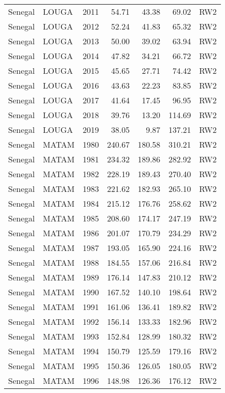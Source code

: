 \begin{longtable}{lllrrrl}
  Senegal & LOUGA & 2011 & 54.71 & 43.38 & 69.02 & RW2 \\ 
  Senegal & LOUGA & 2012 & 52.24 & 41.83 & 65.32 & RW2 \\ 
  Senegal & LOUGA & 2013 & 50.00 & 39.02 & 63.94 & RW2 \\ 
  Senegal & LOUGA & 2014 & 47.82 & 34.21 & 66.72 & RW2 \\ 
  Senegal & LOUGA & 2015 & 45.65 & 27.71 & 74.42 & RW2 \\ 
  Senegal & LOUGA & 2016 & 43.63 & 22.23 & 83.85 & RW2 \\ 
  Senegal & LOUGA & 2017 & 41.64 & 17.45 & 96.95 & RW2 \\ 
  Senegal & LOUGA & 2018 & 39.76 & 13.20 & 114.69 & RW2 \\ 
  Senegal & LOUGA & 2019 & 38.05 & 9.87 & 137.21 & RW2 \\ 
  Senegal & MATAM & 1980 & 240.67 & 180.58 & 310.21 & RW2 \\ 
  Senegal & MATAM & 1981 & 234.32 & 189.86 & 282.92 & RW2 \\ 
  Senegal & MATAM & 1982 & 228.19 & 189.43 & 270.40 & RW2 \\ 
  Senegal & MATAM & 1983 & 221.62 & 182.93 & 265.10 & RW2 \\ 
  Senegal & MATAM & 1984 & 215.12 & 176.76 & 258.62 & RW2 \\ 
  Senegal & MATAM & 1985 & 208.60 & 174.17 & 247.19 & RW2 \\ 
  Senegal & MATAM & 1986 & 201.07 & 170.79 & 234.29 & RW2 \\ 
  Senegal & MATAM & 1987 & 193.05 & 165.90 & 224.16 & RW2 \\ 
  Senegal & MATAM & 1988 & 184.55 & 157.06 & 216.84 & RW2 \\ 
  Senegal & MATAM & 1989 & 176.14 & 147.83 & 210.12 & RW2 \\ 
  Senegal & MATAM & 1990 & 167.52 & 140.10 & 198.64 & RW2 \\ 
  Senegal & MATAM & 1991 & 161.06 & 136.41 & 189.82 & RW2 \\ 
  Senegal & MATAM & 1992 & 156.14 & 133.33 & 182.96 & RW2 \\ 
  Senegal & MATAM & 1993 & 152.84 & 128.99 & 180.32 & RW2 \\ 
  Senegal & MATAM & 1994 & 150.79 & 125.59 & 179.16 & RW2 \\ 
  Senegal & MATAM & 1995 & 150.36 & 126.05 & 180.05 & RW2 \\ 
  Senegal & MATAM & 1996 & 148.98 & 126.36 & 176.12 & RW2 \\ 

\end{longtable}
